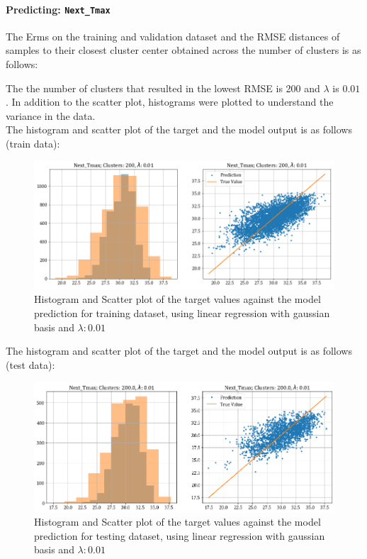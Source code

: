 \documentclass[12pt,a4paper]{article}
\newcommand{\noi}{\noindent}
\def\tt#1{\texttt{#1}}
\begin{document}
\paragraph{Predicting: \tt{Next\_Tmax}}
The Erms on the training and validation dataset and the RMSE distances of samples to their closest cluster center obtained across the number of clusters is as follows:


\noi
The the number of clusters that resulted in the lowest RMSE is 200 and $\lambda$ is $0.01$. In addition to the scatter plot, histograms were plotted to understand the variance in the data.\\

\noi
The histogram and scatter plot of the target and the model output is as follows (train data):
\begin{figure}[H]
     \centering
     \includegraphics[scale=0.49]{images/t3_d3/reg/T_max_nclu_200_lambda_0.01.png}
     \caption{Histogram and Scatter plot of the target values against the model prediction for training dataset, using linear regression with gaussian basis and $\lambda: 0.01$}
\end{figure}

\noi
The histogram and scatter plot of the target and the model output is as follows (test data):
\begin{figure}[H]
    \centering
    \includegraphics[scale=0.49]{images/t3_d3/reg/tmax_test.png}
    \caption{Histogram and Scatter plot of the target values against the model prediction for testing dataset, using linear regression with gaussian basis and $\lambda: 0.01$}
\end{figure}
\end{document}
